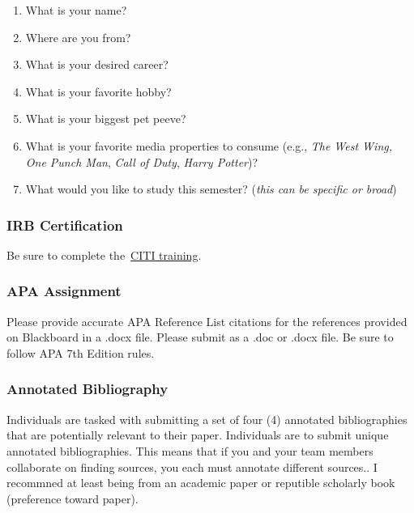 \documentclass[
  b5paper]{book}
\providecommand{\tightlist}{%
  \setlength{\itemsep}{0pt}\setlength{\parskip}{0pt}}
\begin{document}
\begin{enumerate}
\def\labelenumi{\arabic{enumi}.}
\tightlist
\item
  What is your name?
\item
  Where are you from?
\item
  What is your desired career?
\item
  What is your favorite hobby?
\item
  What is your biggest pet peeve?
\item
  What is your favorite media properties to consume (e.g., \emph{The West Wing,} \emph{One Punch Man}, \emph{Call of Duty}, \emph{Harry Potter})?
\item
  What would you like to study this semester? (\emph{this can be specific or broad})
\end{enumerate}

\hypertarget{irb-certification}{%
\subsubsection*{IRB Certification}\label{irb-certification}}

Be sure to complete the~\href{https://www.citiprogram.org/Shibboleth.sso/Login?target=https\%3A\%2F\%2Fwww.citiprogram.org\%2FSecure\%2FWelcome.cfm?inst=551\&entityID=https\%3A\%2F\%2Fsts.windows.net\%2F99f37d21-0b5c-43ea-9103-e16f02f5aecf\%2F}{CITI training}.

\hypertarget{apa-assignment}{%
\subsubsection*{APA Assignment}\label{apa-assignment}}

Please provide accurate APA Reference List citations for the references provided on Blackboard in a .docx file. Please submit as a .doc or .docx file. Be sure to follow APA 7th Edition rules.

\hypertarget{annotated-bibliography}{%
\subsubsection*{Annotated Bibliography}\label{annotated-bibliography}}

Individuals are tasked with submitting a set of four (4) annotated bibliographies that are potentially relevant to their paper. Individuals are to submit unique annotated bibliographies. This means that if you and your team members collaborate on finding sources, you each must annotate different sources.. I recommned at least being from an academic paper or reputible scholarly book (preference toward paper).
\end{document}
